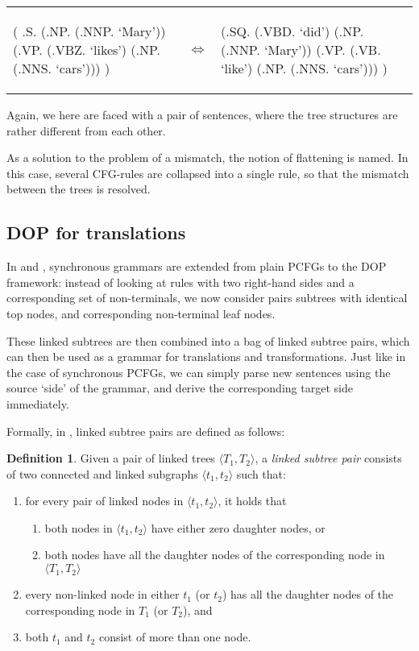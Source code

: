 \documentclass[a4paper]{article}
\theoremstyle{definition}
\newtheorem{definition}[theorem]{Definition}
\begin{document}
\begin{tabular}{lll}
\begin{parsetree}
( .S.
    (.NP. (.NNP. `Mary'))
    (.VP. (.VBZ. `likes')
      (.NP. (.NNS. `cars')))
)
\end{parsetree}
& $\iff$ &
\begin{parsetree}
  (.SQ. (.VBD. `did')
    (.NP. (.NNP. `Mary'))
    (.VP. (.VB. `like')
      (.NP. (.NNS. `cars')))
    )
\end{parsetree}
\end{tabular}

Again, we here are faced with a pair of sentences, where the tree structures are rather different from each other.

As a solution to the problem of a mismatch, the notion of flattening is named. In this case, several CFG-rules are collapsed into a single rule, so that the mismatch between the trees is resolved.

\subsection{DOP for translations}

In \cite{Po} and \cite{Po2}, synchronous grammars are extended from plain PCFGs to the DOP framework: instead of looking at rules with two right-hand sides and a corresponding set of non-terminals, we now consider pairs subtrees with identical top nodes, and corresponding non-terminal leaf nodes.

These linked subtrees are then combined into a bag of linked subtree pairs, which can then be used as a grammar for translations and transformations. Just like in the case of synchronous PCFGs, we can simply parse new sentences using the source `side' of the grammar, and derive the corresponding target side immediately.

Formally, in \cite{Po}, linked subtree pairs are defined as follows:

\begin{definition}
Given a pair of linked trees $\langle T_1, T_2 \rangle$, a \emph{linked subtree pair} consists of two connected and linked subgraphs $\langle t_1, t_2 \rangle$ such that:
\begin{enumerate}
\item for every pair of linked nodes in $\langle t_1, t_2 \rangle$, it holds that
\begin{enumerate}
\item both nodes in $\langle t_1, t_2 \rangle$ have either zero daughter nodes, or
\item both nodes have all the daughter nodes of the corresponding node in $\langle T_1, T_2 \rangle$
\end{enumerate}
\item every non-linked node in either $t_1$ (or $t_2$) has all the daughter nodes of the corresponding node in $T_1$ (or $T_2$), and
\item both $t_1$ and $t_2$ consist of more than one node.
\end{enumerate}
\end{definition}
\end{document}

